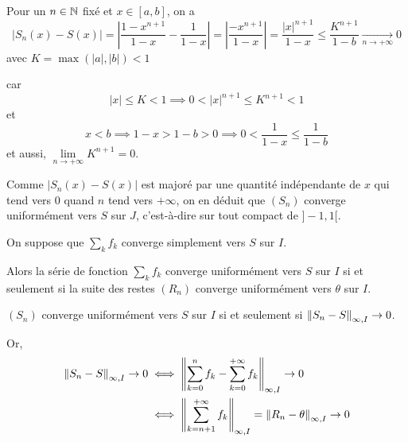 \documentclass[a4paper,12pt]{article}
\begin{document}
\begin{exemple}
    Pour un $n \in \mathbb{N}$ fixé et $x \in [a, b]$, on a
    $$
    |S_n(x) - S(x)| = \left|\dfrac{1-x^{n+1}}{1-x} - \dfrac{1}{1-x}\right| = \left|\dfrac{-x^{n+1}}{1-x}\right| = \dfrac{|x|^{n+1}}{1 - x} \leq \dfrac{K^{n+1}}{1 - b} \underset{n \to +\infty}{\to} 0
    $$
    avec $K = \max(|a|, |b|) < 1$

    car
    $$
    |x| \leq K < 1 \implies 0 < |x|^{n+1} \leq K^{n+1} < 1
    $$
    et
    $$
    x < b \implies 1 - x > 1 - b > 0 \implies 0 < \dfrac{1}{1 - x} \leq \dfrac{1}{1 - b}
    $$
    et aussi, $\lim\limits_{n \to +\infty} K^{n+1} = 0$.

    Comme $|S_n(x) - S(x)|$ est majoré par une quantité indépendante de $x$ qui tend vers $0$ quand $n$ tend vers $+\infty$, on en déduit que
    $(S_n)$ converge uniformément vers $S$ sur $J$, c'est-à-dire sur tout compact de $]-1, 1[$.
\end{exemple}

\begin{proposition}{}{}
    On suppose que $\sum\limits_k f_k$ converge simplement vers $S$ sur $I$.

    Alors la série de fonction $\sum\limits_k f_k$ converge uniformément vers $S$ sur $I$ si et seulement si
    la suite des restes $(R_n)$ converge uniformément vers $\theta$ sur $I$.
\end{proposition}

\begin{demonstration}
    $(S_n)$ converge uniformément vers $S$ sur $I$ si et seulement si $\left\lVert S_n - S\right\rVert_{\infty, I} \to 0$.

    Or,
    \begin{align*}
        \left\lVert S_n - S\right\rVert_{\infty, I} \to 0 &\iff \left\lVert\sum_{k=0}^n f_k - \sum_{k=0}^{+\infty} f_k\right\rVert_{\infty, I} \to 0 \\
        &\iff \left\lVert\sum_{k=n+1}^{+\infty} f_k\right\rVert_{\infty, I} = \left\lVert R_n - \theta\right\rVert_{\infty, I} \to 0
    \end{align*}
\end{demonstration}
\end{document}
